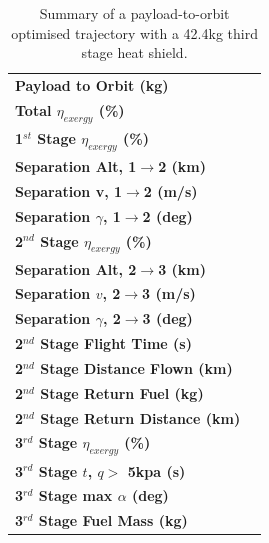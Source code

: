 \begin{table}[!ht]
	\centering
	
	\begin{tabular}{l c } 
		\hline \textbf{Payload to Orbit (kg)}
		& \textbf{\PayloadToOrbitTPSreduced}
		\\
		\textbf{Total $\eta_{exergy}$ (\%)}
		& \textbf{\totalExergyEffTPSreduced}
		\\
		\hline 
		\textbf{1$^{st}$ Stage $\eta_{exergy}$ (\%)}
		& \textbf{\firstExergyEffTPSreduced}
		\\
		\textbf{Separation Alt, 1$\rightarrow$2 (km)}
		& \firstsecondSeparationAltTPSreduced
		\\
		\textbf{Separation v, 1$\rightarrow$2 (m/s)}
		& \firstsecondSeparationvTPSreduced
		\\
		\textbf{Separation $\gamma$, 1$\rightarrow$2 (deg)}
		& \firstsecondSeparationgammaTPSreduced
		\\
		\hline 
		\textbf{2$^{nd}$ Stage $\eta_{exergy}$ (\%)}
		& \textbf{\secondExergyEffTPSreduced}
		\\
		\textbf{Separation Alt, 2$\rightarrow$3 (km)}
		& \secondthirdSeparationAltTPSreduced
		\\
		\textbf{Separation $v$, 2$\rightarrow$3 (m/s)}
		& \secondthirdSeparationvTPSreduced
		\\
		\textbf{Separation $\gamma$, 2$\rightarrow$3 (deg)}
		& \secondthirdSeparationgammaTPSreduced
		\\
		\textbf{2$^{nd}$ Stage Flight Time (s)}
		& \secondFlightTimeTPSreduced
		\\
		\textbf{2$^{nd}$ Stage Distance Flown (km)}
		& \SecondDistTPSreduced
		\\
		\textbf{2$^{nd}$ Stage Return Fuel (kg)}
		& \returnFuelTPSreduced
		\\
		\textbf{2$^{nd}$ Stage Return Distance (km)}
		& \returnDistTPSreduced
		\\
		\hline 
		\textbf{3$^{rd}$ Stage $\eta_{exergy}$ (\%)}
		& \textbf{\thirddExergyEffTPSreduced}
		\\
		\textbf{3$^{rd}$ Stage $t$, $q >$ 5kpa (s)}
		& \thirdqOverFiveTPSreduced
		\\
		\textbf{3$^{rd}$ Stage max $\alpha$ (deg)}
		& \thirdmaxAoATPSreduced
		\\
		\textbf{3$^{rd}$ Stage Fuel Mass (kg)}
		& \thirdmFuelTPSreduced
		\\
		\hline 
	\end{tabular} 
	\caption{Summary of a payload-to-orbit optimised trajectory with a 42.4kg third stage heat shield.}
	\label{tab:heatshieldreduced}
	
\end{table}

